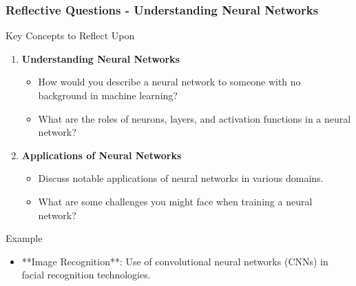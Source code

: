 \documentclass[aspectratio=169]{beamer}
\begin{document}
\begin{frame}[fragile]
    \frametitle{Reflective Questions - Understanding Neural Networks}
    \begin{block}{Key Concepts to Reflect Upon}
        \begin{enumerate}
            \item \textbf{Understanding Neural Networks}
            \begin{itemize}
                \item How would you describe a neural network to someone with no background in machine learning?
                \item What are the roles of neurons, layers, and activation functions in a neural network?
            \end{itemize}
            \item \textbf{Applications of Neural Networks}
            \begin{itemize}
                \item Discuss notable applications of neural networks in various domains.
                \item What are some challenges you might face when training a neural network?
            \end{itemize}
        \end{enumerate}
    \end{block}
    \begin{block}{Example}
        \begin{itemize}
            \item **Image Recognition**: Use of convolutional neural networks (CNNs) in facial recognition technologies.
        \end{itemize}
    \end{block}
\end{frame}
\end{document}
